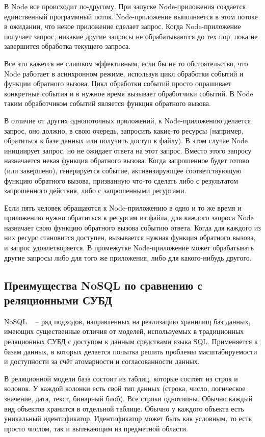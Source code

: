 В Node все происходит по-другому. При запуске Node-приложения создается единственный программный поток. Node-приложение выполняется в этом потоке в ожидании, что некое приложение сделает запрос. Когда Node-приложение получает запрос, никакие другие запросы не обрабатываются до тех пор, пока не завершится обработка текущего запроса.

Все это кажется не слишком эффективным, если бы не то обстоятельство, что Node работает в асинхронном режиме, используя цикл обработки событий и функции обратного вызова. Цикл обработки событий просто опрашивает конкретные события и в нужное время вызывает обработчики событий. В Node таким обработчиком событий является функция обратного вызова.

В отличие от других однопоточных приложений, к Node-приложению делается запрос, оно должно, в свою очередь, запросить какие-то ресурсы (например, обратиться к базе данных или получить доступ к файлу). В этом случае Node инициирует запрос, но не ожидает ответа на этот запрос. Вместо этого запросу назначается некая функция обратного вызова. Когда запрошенное будет готово (или завершено), генерируется событие, активизирующее соответствующую функцию обратного вызова, призванную что-то сделать либо с результатом запрошенного действия, либо с запрошенными ресурсами.

Если пять человек обращаются к Node-приложению в одно и то же время и приложению нужно обратиться к ресурсам из файла, для каждого запроса Node назначает свою функцию обратного вызова событию ответа. Когда для каждого из них ресурс становится доступен, вызывается нужная функция обратного вызова, и запрос удовлетворяется. В промежутке Node-приложение может обрабатывать другие запросы либо для того же приложения, либо для какого-нибудь  другого.



\subsection{Преимущества NoSQL по сравнению с реляционными СУБД}
\label{sub:domain:k2_algo}
NoSQL ~\cite{nosql} – ряд подходов, направленных на реализацию хранилищ баз данных, имеющих существенные отличия от моделей, используемых в традиционных реляционных СУБД с доступом к данным средствами языка SQL. Применяется к базам данных, в которых делается попытка решить проблемы масштабируемости и доступности за счёт атомарности и согласованности данных.

В реляционной модели база состоит из таблиц, которые состоят из строк и колонок. У каждой колонки есть свой тип данных (строка, число, логическое значение, дата, текст, бинарный блоб). Все строки однотипны.
Обычно каждый вид объектов хранится в отдельной таблице. Обычно у каждого объекта есть уникальный идентификатор. Идентификатор может быть как условным, то есть просто числом, так и вытекающим из предметной области.

